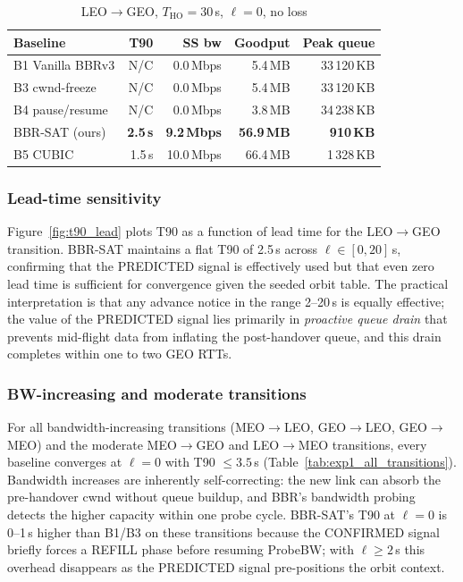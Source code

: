 \begin{table}[t]
\centering
\caption{LEO$\to$GEO, $T_\mathrm{HO}=30$\,s, $\ell=0$, no loss}
\label{tab:exp1_leo_geo}
\small
\begin{tabular}{lrrrr}
\toprule
Baseline & T90 & SS bw & Goodput & Peak queue \\
\midrule
B1 Vanilla BBRv3  & N/C   & 0.0\,Mbps & 5.4\,MB  & 33\,120\,KB \\
B3 cwnd-freeze    & N/C   & 0.0\,Mbps & 5.4\,MB  & 33\,120\,KB \\
B4 pause/resume   & N/C   & 0.0\,Mbps & 3.8\,MB  & 34\,238\,KB \\
BBR-SAT (ours)    & \textbf{2.5\,s} & \textbf{9.2\,Mbps} & \textbf{56.9\,MB} & \textbf{910\,KB} \\
B5 CUBIC          & 1.5\,s & 10.0\,Mbps & 66.4\,MB & 1\,328\,KB \\
\bottomrule
\end{tabular}
\end{table}

\subsubsection{Lead-time sensitivity}

Figure~\ref{fig:t90_lead} plots T90 as a function of lead time for the
LEO$\to$GEO transition.
BBR-SAT maintains a flat T90 of 2.5\,s across $\ell \in [0, 20]$\,s,
confirming that the PREDICTED signal is effectively used but that even
zero lead time is sufficient for convergence given the seeded orbit table.
The practical interpretation is that any advance notice in the range
2--20\,s is equally effective; the value of the PREDICTED signal lies
primarily in \emph{proactive queue drain} that prevents mid-flight data
from inflating the post-handover queue, and this drain completes within
one to two GEO RTTs.

\subsubsection{BW-increasing and moderate transitions}

For all bandwidth-increasing transitions (MEO$\to$LEO, GEO$\to$LEO,
GEO$\to$MEO) and the moderate MEO$\to$GEO and LEO$\to$MEO transitions,
every baseline converges at $\ell = 0$ with T90 $\leq 3.5$\,s
(Table~\ref{tab:exp1_all_transitions}).
Bandwidth increases are inherently self-correcting: the new link can absorb
the pre-handover cwnd without queue buildup, and BBR's bandwidth probing
detects the higher capacity within one probe cycle.
BBR-SAT's T90 at $\ell = 0$ is 0--1\,s higher than B1/B3 on these
transitions because the CONFIRMED signal briefly forces a REFILL
phase before resuming ProbeBW; with $\ell \geq 2$\,s this overhead
disappears as the PREDICTED signal pre-positions the orbit context.

